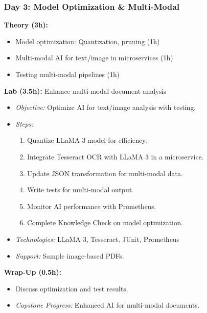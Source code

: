 \documentclass[11pt]{article}
\begin{document}
\subsubsection{Day 3: Model Optimization \& Multi-Modal}
\textbf{Theory (3h):}
\begin{itemize}
    \item Model optimization: Quantization, pruning (1h)
    \item Multi-modal AI for text/image in microservices (1h)
    \item Testing multi-modal pipelines (1h)
\end{itemize}
\textbf{Lab (3.5h):} Enhance multi-modal document analysis
\begin{itemize}
    \item \textit{Objective:} Optimize AI for text/image analysis with testing.
    \item \textit{Steps:}
        \begin{enumerate}
            \item Quantize LLaMA 3 model for efficiency.
            \item Integrate Tesseract OCR with LLaMA 3 in a microservice.
            \item Update JSON transformation for multi-modal data.
            \item Write tests for multi-modal output.
            \item Monitor AI performance with Prometheus.
            \item Complete Knowledge Check on model optimization.
        \end{enumerate}
    \item \textit{Technologies:} LLaMA 3, Tesseract, JUnit, Prometheus
    \item \textit{Support:} Sample image-based PDFs.
\end{itemize}
\textbf{Wrap-Up (0.5h):}
\begin{itemize}
    \item Discuss optimization and test results.
    \item \textit{Capstone Progress:} Enhanced AI for multi-modal documents.
\end{itemize}
\end{document}
